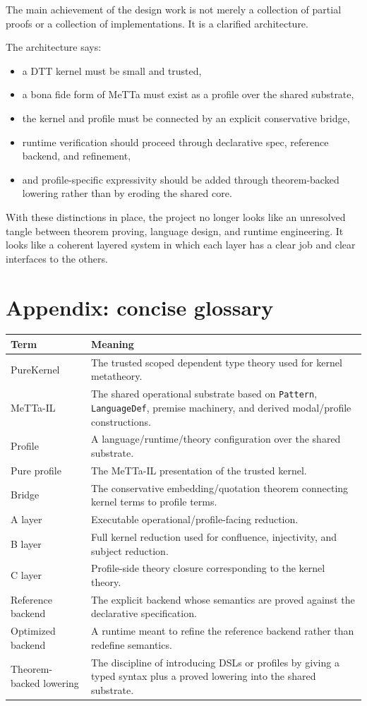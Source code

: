\documentclass[11pt]{article}
\begin{document}
The main achievement of the design work is not merely a collection of partial proofs or a collection of implementations. It is a clarified architecture.

The architecture says:
\begin{itemize}
  \item a DTT kernel must be small and trusted,
  \item a bona fide form of MeTTa must exist as a profile over the shared substrate,
  \item the kernel and profile must be connected by an explicit conservative bridge,
  \item runtime verification should proceed through declarative spec, reference backend, and refinement,
  \item and profile-specific expressivity should be added through theorem-backed lowering rather than by eroding the shared core.
\end{itemize}

With these distinctions in place, the project no longer looks like an unresolved tangle between theorem proving, language design, and runtime engineering. It looks like a coherent layered system in which each layer has a clear job and clear interfaces to the others.

\section*{Appendix: concise glossary}

\begin{longtable}{>{\raggedright\arraybackslash}p{}p{}}
\toprule
Term & Meaning \\
\midrule
\endhead
PureKernel & The trusted scoped dependent type theory used for kernel metatheory. \\
MeTTa-IL & The shared operational substrate based on \texttt{Pattern}, \texttt{LanguageDef}, premise machinery, and derived modal/profile constructions. \\
Profile & A language/runtime/theory configuration over the shared substrate. \\
Pure profile & The MeTTa-IL presentation of the trusted kernel. \\
Bridge & The conservative embedding/quotation theorem connecting kernel terms to profile terms. \\
A layer & Executable operational/profile-facing reduction. \\
B layer & Full kernel reduction used for confluence, injectivity, and subject reduction. \\
C layer & Profile-side theory closure corresponding to the kernel theory. \\
Reference backend & The explicit backend whose semantics are proved against the declarative specification. \\
Optimized backend & A runtime meant to refine the reference backend rather than redefine semantics. \\
Theorem-backed lowering & The discipline of introducing DSLs or profiles by giving a typed syntax plus a proved lowering into the shared substrate. \\
\bottomrule
\end{longtable}
\end{document}
